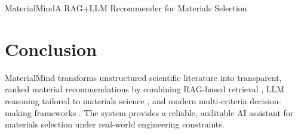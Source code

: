 \begin{teamsubmission}{MaterialMind}{A RAG+LLM Recommender for Materials Selection}
\section*{Conclusion}

MaterialMind transforms unstructured scientific literature into transparent,
ranked material recommendations by combining RAG-based retrieval
\cite{gao2023ragsurvey}, LLM reasoning tailored to materials science
\cite{xie2024darwin,cheng2025aidriven}, and modern multi-criteria
decision-making frameworks
\cite{kes2023mcdmreview,liao2023datadrivenMCDM}. The system provides a
reliable, auditable AI assistant for materials selection under real-world
engineering constraints.



\end{teamsubmission}




